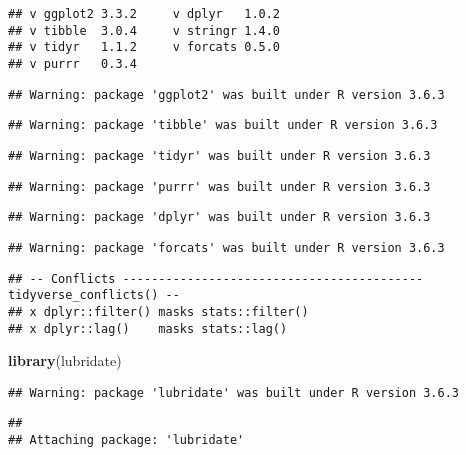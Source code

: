 \documentclass[]{article}
\newenvironment{Shaded}{\begin{snugshade}}{\end{snugshade}}
\newcommand{\KeywordTok}[1]{\textcolor[rgb]{0.13,0.29,0.53}{\textbf{#1}}}
\newcommand{\NormalTok}[1]{#1}
\begin{document}
\begin{verbatim}
## v ggplot2 3.3.2     v dplyr   1.0.2
## v tibble  3.0.4     v stringr 1.4.0
## v tidyr   1.1.2     v forcats 0.5.0
## v purrr   0.3.4
\end{verbatim}

\begin{verbatim}
## Warning: package 'ggplot2' was built under R version 3.6.3
\end{verbatim}

\begin{verbatim}
## Warning: package 'tibble' was built under R version 3.6.3
\end{verbatim}

\begin{verbatim}
## Warning: package 'tidyr' was built under R version 3.6.3
\end{verbatim}

\begin{verbatim}
## Warning: package 'purrr' was built under R version 3.6.3
\end{verbatim}

\begin{verbatim}
## Warning: package 'dplyr' was built under R version 3.6.3
\end{verbatim}

\begin{verbatim}
## Warning: package 'forcats' was built under R version 3.6.3
\end{verbatim}

\begin{verbatim}
## -- Conflicts ------------------------------------------ tidyverse_conflicts() --
## x dplyr::filter() masks stats::filter()
## x dplyr::lag()    masks stats::lag()
\end{verbatim}

\begin{Shaded}
\begin{Highlighting}[]
\KeywordTok{library}\NormalTok{(lubridate)}
\end{Highlighting}
\end{Shaded}

\begin{verbatim}
## Warning: package 'lubridate' was built under R version 3.6.3
\end{verbatim}

\begin{verbatim}
## 
## Attaching package: 'lubridate'
\end{verbatim}
\end{document}
